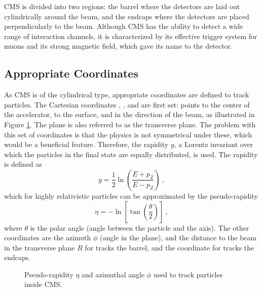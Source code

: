 		CMS is divided into two regions: the barrel where the detectors are laid out cylindrically around the beam, and the endcaps where the detectors are placed perpendicularly to the beam. Although CMS has the ability to detect a wide range of interaction channels, it is characterized by its effective trigger system for muons and its strong magnetic field, which gave its name to the detector.

		\subsection{Appropriate Coordinates}
			\label{sec:lhc_and_cms__appropriated_coordinates}

			As CMS is of the cylindrical type, appropriate coordinates are defined to track particles. The Cartesian coordinates , , and  are first set:  points to the center of the accelerator,  to the surface, and  in the direction of the beam, as illustrated in Figure \ref{fig:lhc_and_cms__cms_coordinates}. The  plane is also referred to as the transverse plane. The problem with this set of coordinates is that the physics is not symmetrical under these, which would be a beneficial feature. Therefore, the rapidity $ y $, a Lorentz invariant over which the particles in the final state are equally distributed, is used. The rapidity is defined as
			\begin{equation}
				y = \frac{1}{2} \ln \left( \frac{E + p_Z}{E - p_Z} \right) \ ,
			\end{equation}
			which for highly relativistic particles can be approximated by the pseudo-rapidity
			\begin{equation}
				\eta = - \ln \left[ \tan \left( \frac{\theta}{2} \right) \right] \ ,
			\end{equation}
			where $ \theta $ is the polar angle (angle between the particle and the  axis). The other coordinates are the azimuth $ \phi $ (angle in the  plane), and the distance to the beam in the transverse plane $ R $ for tracks the barrel, and the  coordinate for tracks the endcaps. \\

			\begin{figure}[h!]
				\centering
				\caption{Pseudo-rapidity $ \eta $ and azimuthal angle $ \phi $ used to track particles inside CMS.}
				\label{fig:lhc_and_cms__cms_coordinates}
			\end{figure}

